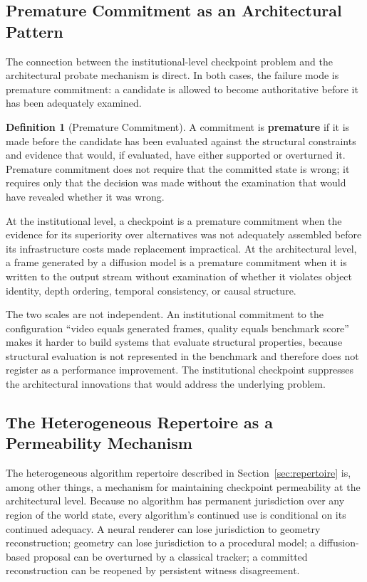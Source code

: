 \documentclass[11pt,a4paper]{article}
\theoremstyle{plain}
\theoremstyle{definition}
\newtheorem{definition}[theorem]{Definition}
\theoremstyle{remark}
\begin{document}
\subsection{Premature Commitment as an Architectural Pattern}

The connection between the institutional-level checkpoint problem and the architectural probate mechanism is direct. In both cases, the failure mode is premature commitment: a candidate is allowed to become authoritative before it has been adequately examined.

\begin{definition}[Premature Commitment]
A commitment is \textbf{premature} if it is made before the candidate has been evaluated against the structural constraints and evidence that would, if evaluated, have either supported or overturned it. Premature commitment does not require that the committed state is wrong; it requires only that the decision was made without the examination that would have revealed whether it was wrong.
\end{definition}

At the institutional level, a checkpoint is a premature commitment when the evidence for its superiority over alternatives was not adequately assembled before its infrastructure costs made replacement impractical. At the architectural level, a frame generated by a diffusion model is a premature commitment when it is written to the output stream without examination of whether it violates object identity, depth ordering, temporal consistency, or causal structure.

The two scales are not independent. An institutional commitment to the configuration ``video equals generated frames, quality equals benchmark score'' makes it harder to build systems that evaluate structural properties, because structural evaluation is not represented in the benchmark and therefore does not register as a performance improvement. The institutional checkpoint suppresses the architectural innovations that would address the underlying problem.

\subsection{The Heterogeneous Repertoire as a Permeability Mechanism}

The heterogeneous algorithm repertoire described in Section~\ref{sec:repertoire} is, among other things, a mechanism for maintaining checkpoint permeability at the architectural level. Because no algorithm has permanent jurisdiction over any region of the world state, every algorithm's continued use is conditional on its continued adequacy. A neural renderer can lose jurisdiction to geometry reconstruction; geometry can lose jurisdiction to a procedural model; a diffusion-based proposal can be overturned by a classical tracker; a committed reconstruction can be reopened by persistent witness disagreement.
\end{document}
